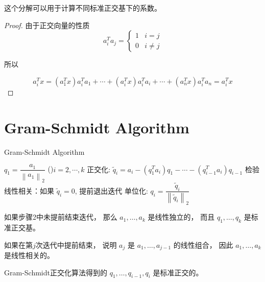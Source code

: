     这个分解可以用于计算不同标准正交基下的系数。 

\begin{proof}
    由于正交向量的性质
    \begin{equation} a_{i}^{T} a_{j}=\left\{\begin{array}{ll}1 & i=j \\ 0 & i \neq j\end{array}\right. \end{equation}

    所以

    \begin{equation} a_{i}^{T} x=\left(a_{1}^{T} x\right) a_{i}^{T} a_{1}+\cdots+\left(a_{i}^{T} x\right) a_{i}^{T} a_{i}+\cdots+\left(a_{n}^{T} x\right) a_{i}^{T} a_{n}=a_{i}^{T} x \end{equation}
\end{proof}

\section{Gram-Schmidt Algorithm}
\label{Chap:Gram-Schmidt Algorithm}
\begin{algorithm}[htbp]
    \caption{Gram-Schmidt Algorithm}
    $ q_{1}= \dfrac{a_{1}}{\left\|a_{1}\right\|_{2}}   $\;
    \While(){$i=2,\cdots,k$}{
        正交化: $ \tilde{q}_{i}=a_{i}-\left(q_{1}^{T} a_{i}\right) q_{1}-\cdots-\left(q_{i-1}^{T} a_{i}\right) q_{i-1} $\;
        检验线性相关：如果 $ \tilde{q}_{i}=0 $, 提前退出迭代\;
        单位化: $
        q_{i}=\dfrac{\tilde{q}_{i}}{\left\|\tilde{q}_{i}\right\|_{2}}$\;
    }
\end{algorithm}

如果步骤2中未提前结束迭代， 那么 $ a_{1}, \ldots, a_{k} $ 是线性独立的， 而且 $ q_{1}, \ldots, q_{k} $ 是标准正交基。 

如果在第$j$次迭代中提前结束， 说明 $ a_{j} $ 是 $ a_{1}, \ldots, a_{j-1} $ 的线性组合， 因此 $ a_{1}, \ldots, a_{k} $ 是线性相关的。 

\begin{theorem}
    \label{thm: qs-are-orthogonal}
    Gram-Schmidt正交化算法得到的
    $q_{1}, \ldots, q_{i-1}, q_{i} $ 是标准正交的。 
\end{theorem}

